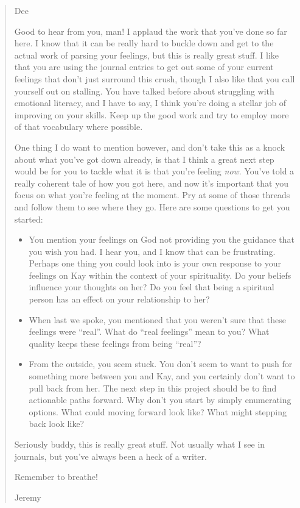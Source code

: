 \begin{quote}
\color{DarkSlateGray}
Dee

Good to hear from you, man! I applaud the work that you've done so far here. I know that it can be really hard to buckle down and get to the actual work of parsing your feelings, but this is really great stuff. I like that you are using the journal entries to get out some of your current feelings that don't just surround this crush, though I also like that you call yourself out on stalling. You have talked before about struggling with emotional literacy, and I have to say, I think you're doing a stellar job of improving on your skills. Keep up the good work and try to employ more of that vocabulary where possible.

One thing I do want to mention however, and don't take this as a knock about what you've got down already, is that I think a great next step would be for you to tackle what it is that you're feeling \emph{now}. You've told a really coherent tale of how you got here, and now it's important that you focus on what you're feeling at the moment. Pry at some of those threads and follow them to see where they go. Here are some questions to get you started:

\begin{itemize}
\tightlist
\item
  You mention your feelings on God not providing you the guidance that you wish you had. I hear you, and I know that can be frustrating. Perhaps one thing you could look into is your own response to your feelings on Kay within the context of your spirituality. Do your beliefs influence your thoughts on her? Do you feel that being a spiritual person has an effect on your relationship to her?
\item
  When last we spoke, you mentioned that you weren't sure that these feelings were ``real''. What do ``real feelings'' mean to you? What quality keeps these feelings from being ``real''?
\item
  From the outside, you seem stuck. You don't seem to want to push for something more between you and Kay, and you certainly don't want to pull back from her. The next step in this project should be to find actionable paths forward. Why don't you start by simply enumerating options. What could moving forward look like? What might stepping back look like?
\end{itemize}

Seriously buddy, this is really great stuff. Not usually what I see in journals, but you've always been a heck of a writer.

Remember to breathe!

Jeremy

\end{quote}

